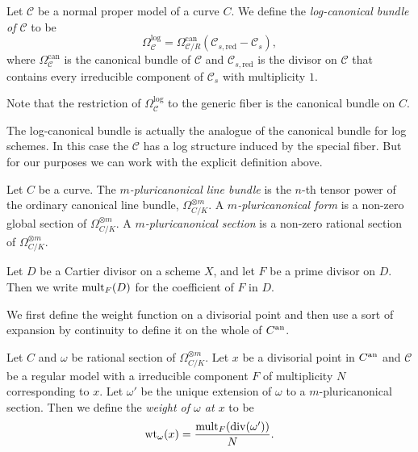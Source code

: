 \begin{definition}\label{def:log_cannonical_bundle}
	Let  $\mathscr C$ be a normal proper model of a curve $C $. 
	We define the \emph{log-canonical bundle of $\mathscr C$} to be \[
		\Omega_{\mathscr C}^{\text{log}}  = \Omega_{\mathscr C / R}^{\text{can}}(\mathscr C_{s, \text{red}} - \mathscr C_s)
	,\] 
	where $\Omega_{\mathscr C} ^{\text{can}}$ is the canonical bundle of $\mathscr C$ and $\mathscr C_{s, \text{red}}$ is the divisor on $\mathscr C$ that contains every irreducible component of $\mathscr C_s$ with multiplicity $1$.  
\end{definition}

Note that the restriction of $\Omega_{\mathscr C}^{\log}$ to the generic fiber is the canonical bundle on $C$. 

\begin{remark}
	The log-canonical bundle is actually the analogue of the canonical bundle for log schemes. 
	In this case the $\mathscr C$ has a log structure induced by the special fiber. 
	But for our purposes we can work with the explicit definition above. 
\end{remark}
\begin{definition}
	Let $C $ be a curve.
	The \emph{$m$-pluricanonical line bundle} is the $n$-th tensor power of the ordinary canonical line bundle, $\Omega_{C / K}^{\otimes m }$. 
	A \emph{$m$-pluricanonical form}  is a non-zero global section of $\Omega_{C / K}^{\otimes m }$. 
	A \emph{$m$-pluricanonical section} is a non-zero rational section of $\Omega_{C / K}^{\otimes m }$.
\end{definition}
\begin{notation}
	Let $D$ be a Cartier divisor on a scheme $X$, and let $F$ be a prime divisor on $D$. 
	Then we write $\operatorname{mult}_{F}(D)$ for the coefficient of $F$ in $D$. 
\end{notation}

We first define the weight function on a divisorial point and then use a sort of expansion by continuity to define it on the whole of $C{}^{\text{an}}$. 
\begin{definition}\label{def:weight_function_divisorial_point}
	Let $C$ and $\omega$ be rational section of $\Omega_{C / K}^{\otimes m}$.
	Let $x$ be a divisorial point in $C{}^{\text{an}}$ and $\mathscr C$ be a regular model  with a irreducible component $F$ of multiplicity $N$ corresponding to $x$. 
	Let $\omega'$ be the unique extension of $\omega$ to a $m$-pluricanonical section. 
	Then we define the \emph{weight of $\omega$ at $x$} to be \[
		\operatorname{wt}_\omega(x) = \frac{\operatorname{mult}_F(\operatorname{div}(\omega'))}{N}
	.\] 
\end{definition}

